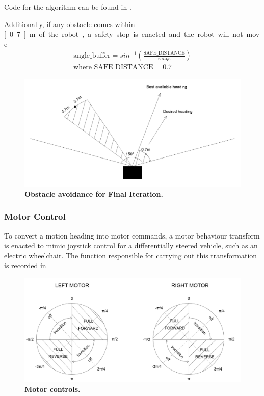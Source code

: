 \documentclass[titlepage,12pt,a4paper]{article}
\begin{document}
Code for the algorithm can be found in .

Additionally, if any obstacle comes within \unit[0.7]{m} of the robot, a safety stop is enacted and the robot will not move.

\begin{equation}
\begin{split}
	\text{angle\_buffer} = sin^{-1}(\frac{\text{SAFE\_DISTANCE}}{range})\\
	\text{where } \text{SAFE\_DISTANCE} = 0.7
\end{split}
	\label{equation:bearing_buffer}
\end{equation}

\begin{figure}[h]
	\centering
	\includegraphics[scale=0.25]{figures/finalObstacle.png}
	\caption{\textbf{Obstacle avoidance for Final Iteration.}}
\end{figure}

\subsubsection{Motor Control}

To convert a motion heading into motor commands, a motor behaviour transform is enacted to mimic joystick control for a differentially steered vehicle, such as an electric wheelchair. The function responsible for carrying out this transformation is recorded in 

\begin{figure}[h]
	\centering
	\includegraphics[scale=0.25]{figures/motors.png}
	\caption{\textbf{Motor controls.}}
\end{figure}
\end{document}
